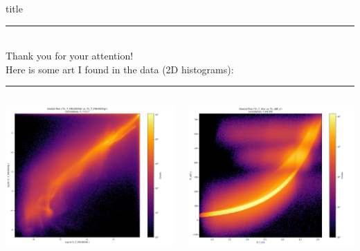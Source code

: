 \documentclass[aspectratio=1610, 10pt]{beamer}
\begin{document}
\begin{frame}[plain]
  \centering
  \begin{beamercolorbox}[center, wd=\textwidth]{title}
    \textcolor{tugreen}{\rule{\textwidth}{1pt}}\\[0.5\baselineskip]%
    Thank you for your attention!
    \\[0.5\baselineskip]%
    Here is some art I found in the data (2D histograms):\newline%
    \textcolor{tugreen}{\rule{\textwidth}{1pt}}%
  \end{beamercolorbox}%
  \begin{columns}
    \begin{column}{0.5\textwidth}
      \centering
      \includegraphics[width=1.1\textwidth]{images/backup/art1.png}
    \end{column}
    \begin{column}{0.5\textwidth}
      \centering
      \includegraphics[width=1.1\textwidth]{images/backup/art2.png}
    \end{column}
  \end{columns}
\end{frame}
\end{document}

